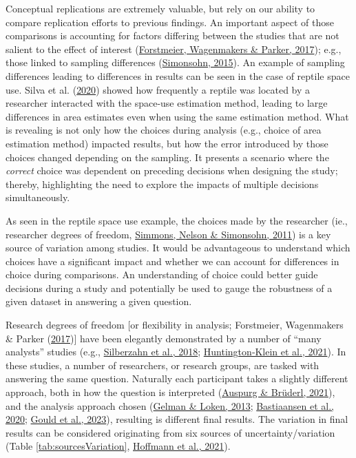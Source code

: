 \documentclass[10pt,a4paper]{article}
\begin{document}
Conceptual replications are extremely valuable, but rely on our ability to compare replication efforts to previous findings.
An important aspect of those comparisons is accounting for factors differing between the studies that are not salient to the effect of interest (\protect\hyperlink{ref-forstmeier_detecting_2017}{Forstmeier, Wagenmakers \& Parker, 2017}); e.g., those linked to sampling differences (\protect\hyperlink{ref-simonsohn_small_2015}{Simonsohn, 2015}).
An example of sampling differences leading to differences in results can be seen in the case of reptile space use.
Silva et al. (\protect\hyperlink{ref-silva_reptiles_2020}{2020}) showed how frequently a reptile was located by a researcher interacted with the space-use estimation method, leading to large differences in area estimates even when using the same estimation method.
What is revealing is not only how the choices during analysis (e.g., choice of area estimation method) impacted results, but how the error introduced by those choices changed depending on the sampling.
It presents a scenario where the \emph{correct} choice was dependent on preceding decisions when designing the study; thereby, highlighting the need to explore the impacts of multiple decisions simultaneously.

As seen in the reptile space use example, the choices made by the researcher (ie., researcher degrees of freedom, \protect\hyperlink{ref-simmons_false-positive_2011}{Simmons, Nelson \& Simonsohn, 2011}) is a key source of variation among studies.
It would be advantageous to understand which choices have a significant impact and whether we can account for differences in choice during comparisons.
An understanding of choice could better guide decisions during a study and potentially be used to gauge the robustness of a given dataset in answering a given question.

Research degrees of freedom {[}or flexibility in analysis; Forstmeier, Wagenmakers \& Parker (\protect\hyperlink{ref-forstmeier_detecting_2017}{2017}){]} have been elegantly demonstrated by a number of ``many analysts'' studies (e.g., \protect\hyperlink{ref-silberzahn_many_2018}{Silberzahn et al., 2018}; \protect\hyperlink{ref-huntingtonklein_influence_2021}{Huntington‐Klein et al., 2021}).
In these studies, a number of researchers, or research groups, are tasked with answering the same question.
Naturally each participant takes a slightly different approach, both in how the question is interpreted (\protect\hyperlink{ref-auspurg_has_2021}{Auspurg \& Brüderl, 2021}), and the analysis approach chosen (\protect\hyperlink{ref-gelman_garden_2013}{Gelman \& Loken, 2013}; \protect\hyperlink{ref-bastiaansen_time_2020}{Bastiaansen et al., 2020}; \protect\hyperlink{ref-gould_same_2023}{Gould et al., 2023}), resulting is different final results.
The variation in final results can be considered originating from six sources of uncertainty/variation (Table \ref{tab:sourcesVariation}, \protect\hyperlink{ref-hoffmann_multiplicity_2021}{Hoffmann et al., 2021}).
\end{document}
